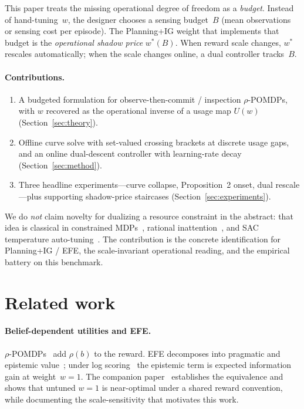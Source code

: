 \documentclass[runningheads]{llncs}
\begin{document}
This paper treats the missing operational degree of freedom as a \emph{budget}. Instead of hand-tuning~$w$, the designer chooses a sensing budget~$B$ (mean observations or sensing cost per episode). The Planning+IG weight that implements that budget is the \emph{operational shadow price} $w^*(B)$. When reward scale changes, $w^*$ rescales automatically; when the scale changes online, a dual controller tracks~$B$.

\paragraph{Contributions.}
\begin{enumerate}[leftmargin=*]
  \item A budgeted formulation for observe-then-commit / inspection $\rho$-POMDPs, with $w$ recovered as the operational inverse of a usage map $U(w)$ (Section~\ref{sec:theory}).
  \item Offline curve solve with set-valued crossing brackets at discrete usage gaps, and an online dual-descent controller with learning-rate decay (Section~\ref{sec:method}).
  \item Three headline experiments---curve collapse, Proposition~2 onset, dual re\-scale---plus supporting shadow-price staircases (Section~\ref{sec:experiments}).
\end{enumerate}

We do \emph{not} claim novelty for dualizing a resource constraint in the abstract: that idea is classical in constrained MDPs~\citep{altman1999}, rational inattention~\citep{sims2003,matejka2015}, and SAC temperature auto-tuning~\citep{haarnoja2018sac}. The contribution is the concrete identification for Planning+IG / EFE, the scale-invariant operational reading, and the empirical battery on this benchmark.

\section{Related work}

\paragraph{Belief-dependent utilities and EFE.}
$\rho$-POMDPs~\citep{araya2010,fehr2018} add $\rho(b)$ to the reward. EFE decomposes into pragmatic and epistemic value~\citep{friston2015,parr2019}; under log scoring~\citep{bernardo1979} the epistemic term is expected information gain at weight~$w{=}1$. The companion paper~\citep{cooper2026efe} establishes the equivalence and shows that untuned $w{=}1$ is near-optimal under a shared reward convention, while documenting the scale-sensitivity that motivates this work.
\end{document}
